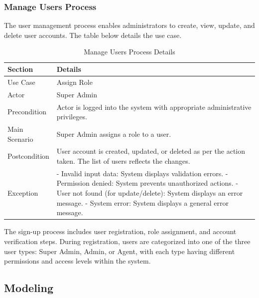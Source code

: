 \newpage
\subsubsection{Manage Users Process}
The user management process enables administrators to create, view, update, and delete user accounts. The table below details the use case.


\begin{table}[htbp]
    \centering
    \begin{tabular}{|l|p{}|}
        \hline
        \textbf{Section} & \textbf{Details} \\
        \hline
        Use Case & Assign Role \\
        \hline
        Actor & Super Admin \\
        \hline
        Precondition & Actor is logged into the system with appropriate administrative privileges. \\
        \hline
        Main Scenario & 
        Super Admin assigns a role to a user. \\
        \hline
        Postcondition & User account is created, updated, or deleted as per the action taken. The list of users reflects the changes. \\
        \hline
        Exception & 
        - Invalid input data: System displays validation errors.
        - Permission denied: System prevents unauthorized actions.
        - User not found (for update/delete): System displays an error message.
        - System error: System displays a general error message. \\
        \hline
    \end{tabular}
    \caption{Manage Users Process Details}
    \label{tab:manage_users_process}
\end{table}


The sign-up process includes user registration, role assignment, and account verification steps. During registration, users are categorized into one of the three user types: Super Admin, Admin, or Agent, with each type having different permissions and access levels within the system.

\subsection{Modeling}

\newpage    

